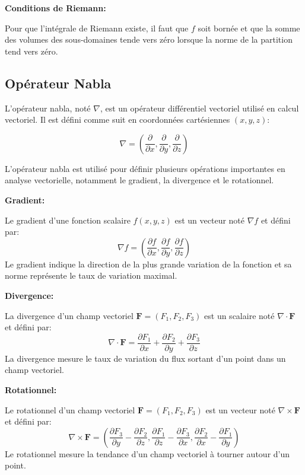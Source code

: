 \textbf{Conditions de Riemann:}

Pour que l'intégrale de Riemann existe, il faut que $f$ soit bornée et que la somme des volumes des sous-domaines tende vers zéro lorsque la norme de la partition tend vers zéro.





\subsection{Opérateur Nabla}

L'opérateur nabla, noté $\nabla$, est un opérateur différentiel vectoriel utilisé en calcul vectoriel. Il est défini comme suit en coordonnées cartésiennes $(x, y, z)$:

$$
\nabla = \left( \frac{\partial}{\partial x}, \frac{\partial}{\partial y}, \frac{\partial}{\partial z} \right)
$$

L'opérateur nabla est utilisé pour définir plusieurs opérations importantes en analyse vectorielle, notamment le gradient, la divergence et le rotationnel.

\textbf{Gradient:}

Le gradient d'une fonction scalaire $f(x, y, z)$ est un vecteur noté $\nabla f$ et défini par:
$$
\nabla f = \left( \frac{\partial f}{\partial x}, \frac{\partial f}{\partial y}, \frac{\partial f}{\partial z} \right)
$$
Le gradient indique la direction de la plus grande variation de la fonction et sa norme représente le taux de variation maximal.

\textbf{Divergence:}

La divergence d'un champ vectoriel $\mathbf{F} = (F_1, F_2, F_3)$ est un scalaire noté $\nabla \cdot \mathbf{F}$ et défini par:
$$
\nabla \cdot \mathbf{F} = \frac{\partial F_1}{\partial x} + \frac{\partial F_2}{\partial y} + \frac{\partial F_3}{\partial z}
$$
La divergence mesure le taux de variation du flux sortant d'un point dans un champ vectoriel.

\textbf{Rotationnel:}

Le rotationnel d'un champ vectoriel $\mathbf{F} = (F_1, F_2, F_3)$ est un vecteur noté $\nabla \times \mathbf{F}$ et défini par:
$$
\nabla \times \mathbf{F} = \left( \frac{\partial F_3}{\partial y} - \frac{\partial F_2}{\partial z}, \frac{\partial F_1}{\partial z} - \frac{\partial F_3}{\partial x}, \frac{\partial F_2}{\partial x} - \frac{\partial F_1}{\partial y} \right)
$$
Le rotationnel mesure la tendance d'un champ vectoriel à tourner autour d'un point.

